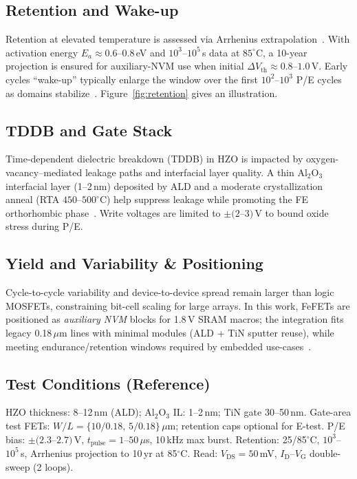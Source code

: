 \documentclass[journal]{IEEEtran}
\begin{document}
\subsection*{Retention and Wake-up}
Retention at elevated temperature is assessed via Arrhenius extrapolation~\cite{yamazaki2018}. With activation energy $E_a\!\approx\!0.6$--$0.8$\,eV and $10^3$--$10^5$\,s data at $85^\circ$C, a 10-year projection is ensured for auxiliary-NVM use when initial $\Delta V_\mathrm{th}\!\approx\!0.8$--$1.0$\,V. Early cycles “wake-up” typically enlarge the window over the first $10^2$--$10^3$ P/E cycles as domains stabilize~\cite{boscke2011,muller2012}. Figure~\ref{fig:retention} gives an illustration.

\subsection*{TDDB and Gate Stack}
Time-dependent dielectric breakdown (TDDB) in HZO is impacted by oxygen-vacancy–mediated leakage paths and interfacial layer quality. A thin Al$_2$O$_3$ interfacial layer (1--2\,nm) deposited by ALD and a moderate crystallization anneal (RTA $450$--$500^\circ$C) help suppress leakage while promoting the FE orthorhombic phase~\cite{schenk2019,mueller2015}. Write voltages are limited to $\pm(2$--$3)$\,V to bound oxide stress during P/E.

\subsection*{Yield and Variability \& Positioning}
Cycle-to-cycle variability and device-to-device spread remain larger than logic MOSFETs, constraining bit-cell scaling for large arrays. In this work, FeFETs are positioned as \emph{auxiliary NVM} blocks for 1.8\,V SRAM macros; the integration fits legacy 0.18\,$\mu$m lines with minimal modules (ALD + TiN sputter reuse), while meeting endurance/retention windows required by embedded use-cases~\cite{polakowski2014,nakamura2003}.

\subsection*{Test Conditions (Reference)}
HZO thickness: 8--12\,nm (ALD); Al$_2$O$_3$ IL: 1--2\,nm; TiN gate 30--50\,nm. Gate-area test FETs: $W/L=\{10/0.18,\,5/0.18\}$\,$\mu$m; retention caps optional for E-test. P/E bias: $\pm(2.3$--$2.7)$\,V, $t_\mathrm{pulse}=1$--$50\,\mu$s, 10\,kHz max burst. Retention: 25/85$^\circ$C, $10^3$--$10^5$\,s, Arrhenius projection to 10\,yr at 85$^\circ$C. Read: $V_\mathrm{DS}=50$\,mV, $I_\mathrm{D}$--$V_\mathrm{G}$ double-sweep (2 loops).
\end{document}
